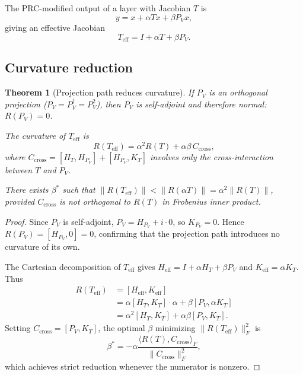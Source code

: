 \documentclass[11pt,a4paper]{article}
\newtheorem{theorem}{Theorem}[section]
\theoremstyle{definition}
\begin{document}
The PRC-modified output of a layer with Jacobian $T$ is
\[
  y = x + \alpha Tx + \beta P_V x,
\]
giving an effective Jacobian
\[
  T_{\mathrm{eff}} = I + \alpha T + \beta P_V.
\]

\subsection{Curvature reduction}

\begin{theorem}[Projection path reduces curvature]
\label{thm:curvature-reduction}
If $P_V$ is an orthogonal projection ($P_V = P_V^\dagger = P_V^2$), then
$P_V$ is self-adjoint and therefore normal: $R(P_V) = 0$.

The curvature of $T_{\mathrm{eff}}$ is
\[
  R(T_{\mathrm{eff}}) = \alpha^2 R(T) + \alpha\beta \, C_{\mathrm{cross}},
\]
where $C_{\mathrm{cross}} = [H_T, H_{P_V}] + [H_{P_V}, K_T]$ involves only
the cross-interaction between $T$ and $P_V$.

There exists $\beta^*$ such that
$\|R(T_{\mathrm{eff}})\| < \|R(\alpha T)\| = \alpha^2 \|R(T)\|$,
provided $C_{\mathrm{cross}}$ is not orthogonal to $R(T)$ in Frobenius inner product.
\end{theorem}

\begin{proof}
Since $P_V$ is self-adjoint, $P_V = H_{P_V} + i \cdot 0$, so $K_{P_V} = 0$.
Hence $R(P_V) = [H_{P_V}, 0] = 0$, confirming that the projection path
introduces no curvature of its own.

The Cartesian decomposition of $T_{\mathrm{eff}}$ gives
$H_{\mathrm{eff}} = I + \alpha H_T + \beta P_V$ and $K_{\mathrm{eff}} = \alpha K_T$.
Thus
\begin{align*}
  R(T_{\mathrm{eff}}) &= [H_{\mathrm{eff}}, K_{\mathrm{eff}}] \\
  &= \alpha [H_T, K_T] \cdot \alpha + \beta[P_V, \alpha K_T] \\
  &= \alpha^2 [H_T, K_T] + \alpha\beta [P_V, K_T].
\end{align*}
Setting $C_{\mathrm{cross}} = [P_V, K_T]$, the optimal $\beta$ minimizing
$\|R(T_{\mathrm{eff}})\|_F^2$ is
\[
  \beta^* = -\alpha \frac{\langle R(T), C_{\mathrm{cross}}\rangle_F}
                         {\|C_{\mathrm{cross}}\|_F^2},
\]
which achieves strict reduction whenever the numerator is nonzero.
\end{proof}
\end{document}
